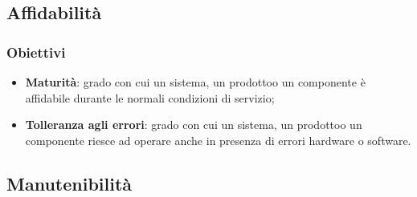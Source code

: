     \subsection{Affidabilità}
        \subsubsection{Obiettivi}
            \begin{itemize}
                \item \textbf{Maturità}: grado con cui un sistema, un prodotto\glosp o un componente è affidabile durante le normali condizioni di servizio;
                \item \textbf{Tolleranza agli errori}: grado con cui un sistema, un prodotto\glosp o un componente riesce ad operare anche in presenza di errori hardware o software.
            \end{itemize}
    \subsection{Manutenibilità}
